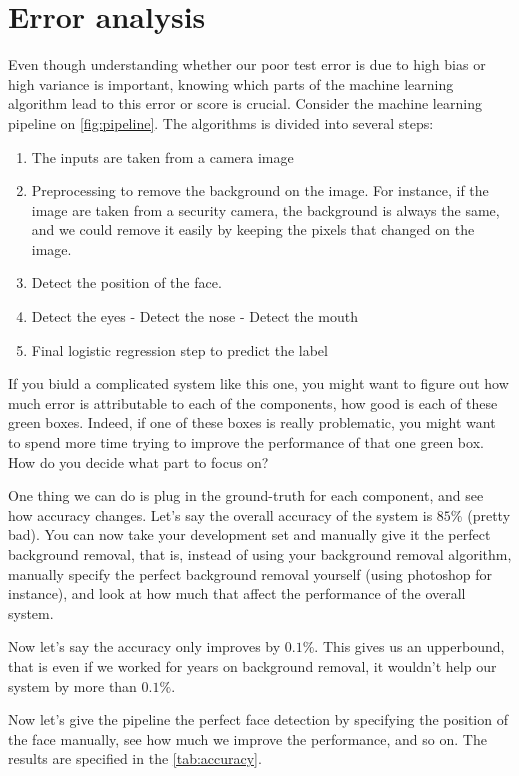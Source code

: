 \section{Error analysis}
Even though understanding whether our poor test error is due to high bias or high variance
is important, knowing which parts of the machine learning algorithm lead to this error or
score is crucial. Consider the machine learning pipeline on \cref{fig:pipeline}. %
The algorithms is divided into several steps:
\begin{enumerate}
    \item The inputs are taken from a camera image
    \item Preprocessing to remove the background on the image. For instance, if the image are
    taken from a security camera, the background is always the same, and we could remove
    it easily by keeping the pixels that changed on the image.
    \item Detect the position of the face.
    \item Detect the eyes - Detect the nose - Detect the mouth
    \item Final logistic regression step to predict the label
\end{enumerate}


If you biuld a complicated system like this one, you might want to figure out how much
error is attributable to each of the components, how good is each of these green boxes.
Indeed, if one of these boxes is really problematic, you might want to spend more time
trying to improve the performance of that one green box. How do you decide what part to
focus on?

One thing we can do is plug in the ground-truth for each component, and see how
accuracy changes. Let's say the overall accuracy of the system is $85\%$ (pretty bad). You
can now take your development set and manually give it the perfect background removal,
that is, instead of using your background removal algorithm, manually specify the perfect
background removal yourself (using photoshop for instance), and look at how much that
affect the performance of the overall system.

Now let's say the accuracy only improves by $0.1\%$. This gives us an upperbound, that
is even if we worked for years on background removal, it wouldn't help our system by more
than $0.1\%$.

Now let's give the pipeline the perfect face detection by specifying the position of the
face manually, see how much we improve the performance, and so on.
The results are specified in the \cref{tab:accuracy}.

